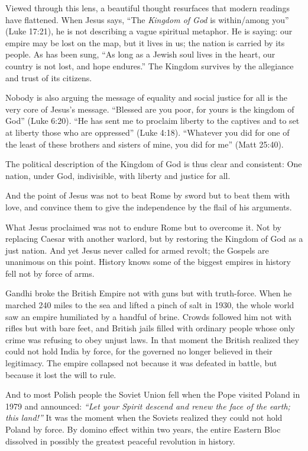 Viewed through this lens, a beautiful thought resurfaces that modern readings have flattened.
When Jesus says, ``The \emph{Kingdom of God} is within/among you'' (Luke 17:21), he is not describing a vague spiritual metaphor.
He is saying: our empire may be lost on the map, but it lives in us; the nation is carried by its people.
As has been sung, ``As long as a Jewish soul lives in the heart, our country is not lost, and hope endures.''
The Kingdom survives by the allegiance and trust of its citizens.

Nobody is also arguing the message of equality and social justice for all is the very core of Jesus’s message.
“Blessed are you poor, for yours is the kingdom of God” (Luke 6:20).
“He has sent me to proclaim liberty to the captives and to set at liberty those who are oppressed” (Luke 4:18).
“Whatever you did for one of the least of these brothers and sisters of mine, you did for me” (Matt 25:40).

The political description of the Kingdom of God is thus clear and consistent:
One nation, under God, indivisible, with liberty and justice for all.

And the point of Jesus was not to beat Rome by sword but to beat them with love,
and convince them to give the independence by the flail of his arguments.

What Jesus proclaimed was not to endure Rome but to overcome it.
Not by replacing Caesar with another warlord, but by restoring the Kingdom of God as a just nation.
And yet Jesus never called for armed revolt; the Gospels are unanimous on this point.
History knows some of the biggest empires in history fell not by force of arms.

Gandhi broke the British Empire not with guns but with truth-force.
When he marched 240 miles to the sea and lifted a pinch of salt in 1930, the whole world saw an empire humiliated by a handful of brine.
Crowds followed him not with rifles but with bare feet, and British jails filled with ordinary people whose only crime was refusing to obey unjust laws.
In that moment the British realized they could not hold India by force, for the governed no longer believed in their legitimacy.
The empire collapsed not because it was defeated in battle, but because it lost the will to rule.

And to most Polish people the Soviet Union fell when the Pope visited Poland in 1979 and announced:
\emph{“Let your Spirit descend and renew the face of the earth; this land!”}
It was the moment when the Soviets realized they could not hold Poland by force.
By domino effect within two years, the entire Eastern Bloc dissolved in possibly the greatest peaceful revolution in history.

